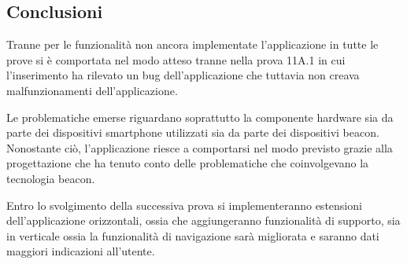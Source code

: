 \documentclass[../Sperimentazione.tex]{subfiles}
\begin{document}
		\newpage
		\subsection{Conclusioni}
			Tranne per le funzionalità non ancora implementate l'applicazione in tutte le prove si è comportata nel modo atteso tranne nella prova 11A.1 in cui l'inserimento ha rilevato un bug  dell'applicazione che tuttavia non creava malfunzionamenti dell'applicazione. 
			
			Le problematiche emerse riguardano soprattutto la componente hardware sia da parte dei dispositivi smartphone utilizzati sia da parte dei dispositivi beacon. Nonostante ciò, l'applicazione riesce a comportarsi nel modo previsto grazie alla progettazione che ha tenuto conto delle problematiche che coinvolgevano la tecnologia beacon. 
			
			Entro lo svolgimento della successiva prova si implementeranno estensioni dell'applicazione orizzontali, ossia che aggiungeranno funzionalità di supporto, sia in verticale ossia la funzionalità di navigazione sarà migliorata e saranno dati maggiori indicazioni all'utente. 
\end{document}
